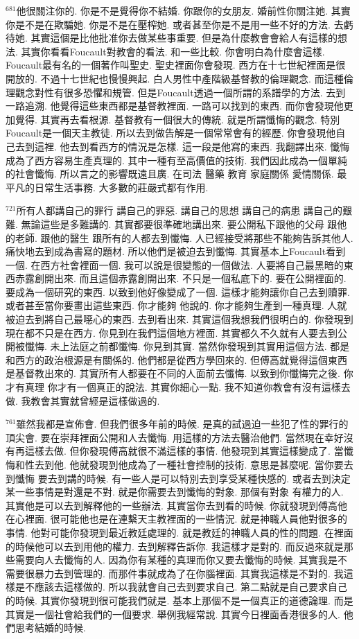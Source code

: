 \documentclass{book}
\begin{document}
$^{681}$他很關注你的.
你是不是覺得你不結婚.
你跟你的女朋友.
婚前性你關注她.
其實你是不是在欺騙她.
你是不是在壓榨她.
或者甚至你是不是用一些不好的方法.
去虧待她.
其實這個是比他批准你去做某些事重要.
但是為什麼教會會給人有這樣的想法.
其實你看看Foucault對教會的看法.
和一些比較.
你會明白為什麼會這樣.
Foucault最有名的一個著作叫聖史.
聖史裡面你會發現.
西方在十七世紀裡面是很開放的.
不過十七世紀也慢慢興起.
白人男性中產階級基督教的倫理觀念.
而這種倫理觀念對性有很多恐懼和規管.
但是Foucault透過一個所謂的系譜學的方法.
去到一路追溯.
他覺得這些東西都是基督教裡面.
一路可以找到的東西.
而你會發現他更加覺得.
其實再去看根源.
基督教有一個很大的傳統.
就是所謂懺悔的觀念.
特別Foucault是一個天主教徒.
所以去到做告解是一個常常會有的經歷.
你會發現他自己去到這裡.
他去到看西方的情況是怎樣.
這一段是他寫的東西.
我翻譯出來.
懺悔成為了西方容易生產真理的.
其中一種有至高價值的技術.
我們因此成為一個單純的社會懺悔.
所以言之的影響既遠且廣.
在司法 醫藥 教育 家庭關係 愛情關係.
最平凡的日常生活事務.
大多數的莊嚴式都有作用.

$^{721}$所有人都講自己的罪行 講自己的罪惡.
講自己的思想 講自己的病患 講自己的艱難.
無論這些是多難講的.
其實都要很準確地講出來.
要公開私下跟他的父母 跟他的老師.
跟他的醫生 跟所有的人都去到懺悔.
人已經接受將那些不能夠告訴其他人.
痛快地去到成為書寫的題材.
所以他們是被迫去到懺悔.
其實基本上Foucault看到一個.
在西方社會裡面一個.
我可以說是很變態的一個做法.
人要將自己最黑暗的東西赤露創開出來.
而且這個赤露創開出來.
不只是一個私底下的.
要在公開裡面的.
要成為一個研究的東西.
以致到他好像變成了一個.
這樣才能夠讓你自己去到贖罪.
或者甚至當你要畫出這些東西.
你才能夠 他說的.
你才能夠生產到一種真理.
人就被迫去到將自己最噁心的東西.
去到看出來.
其實這個我想我們很明白的.
你發現到現在都不只是在西方.
你見到在我們這個地方裡面.
其實都久不久就有人要去到公開被懺悔.
未上法庭之前都懺悔.
你見到其實.
當然你發現到其實用這個方法.
都是和西方的政治根源是有關係的.
他們都是從西方學回來的.
但傅高就覺得這個東西是基督教出來的.
其實所有人都要在不同的人面前去懺悔.
以致到你懺悔完之後.
你才有真理 你才有一個真正的說法.
其實你細心一點.
我不知道你教會有沒有這樣去做.
我教會其實就曾經是這樣做過的.

$^{761}$雖然我都是宣佈會.
但我們很多年前的時候.
是真的試過迫一些犯了性的罪行的頂尖會.
要在崇拜裡面公開和人去懺悔.
用這樣的方法去醫治他們.
當然現在幸好沒有再這樣去做.
但你發現傅高就很不滿這樣的事情.
他發現到其實這樣變成了.
當懺悔和性去到他.
他就發現到他成為了一種社會控制的技術.
意思是甚麼呢.
當你要去到懺悔 要去到講的時候.
有一些人是可以特別去到享受某種快感的.
或者去到決定某一些事情是對還是不對.
就是你需要去到懺悔的對象.
那個有對象 有權力的人.
其實他是可以去到解釋他的一些辦法.
其實當你去到看的時候.
你就發現到傅高他在心裡面.
很可能他也是在連繫天主教裡面的一些情況.
就是神職人員他對很多的事情.
他對可能你發現到最近教廷處理的.
就是教廷的神職人員的性的問題.
在裡面的時候他可以去到用他的權力.
去到解釋告訴你.
我這樣才是對的.
而反過來就是那些需要向人去懺悔的人.
因為你有某種的真理而你又要去懺悔的時候.
其實我是不需要很暴力去到管理的.
而那件事就成為了在你腦裡面.
其實我這樣是不對的.
我這樣是不應該去這樣做的.
所以我就會自己去到要求自己.
第二點就是自己要求自己的時候.
其實你發現到很可能我們就是.
基本上那個不是一個真正的道德論理.
而是其實是一個社會給我們的一個要求.
舉例我經常說.
其實今日裡面香港很多的人.
他們思考結婚的時候.
\end{document}
